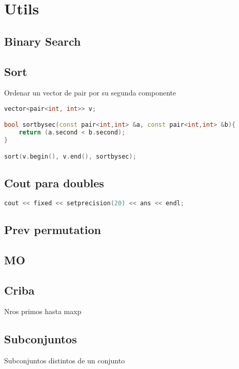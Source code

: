 \section{Utils}

\subsection{Binary Search}


\subsection{Sort}
Ordenar un vector de pair por su segunda componente
\begin{lstlisting}[language=C++]
vector<pair<int, int>> v;

bool sortbysec(const pair<int,int> &a, const pair<int,int> &b){
	return (a.second < b.second);
}

sort(v.begin(), v.end(), sortbysec);
\end{lstlisting}
\subsection{Cout para doubles}
\begin{lstlisting}[language=C++]
cout << fixed << setprecision(20) << ans << endl;
\end{lstlisting}
\subsection{Prev permutation}

\subsection{MO}


\subsection{Criba}
Nros primos hasta maxp


\subsection{Subconjuntos}
Subconjuntos distintos de un conjunto


